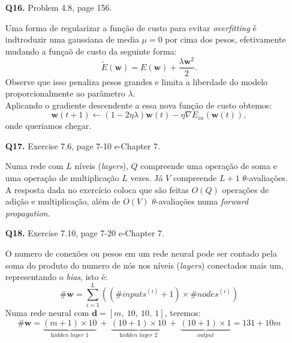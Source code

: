 \documentclass[12pt]{article}
\begin{document}
\begin{enumerate}
\begin{addmargin}[1em]{2em}
\begin{align*}
		\end{align*}
		\begin{itemize}
			\item[a)] Queremos $\nabla E_{in}(\mathbf{w}) = 0$, então, da expressão acima o valor de \textbf{w} que minimiza $E_{in}$ é $\mathbf{w_{lin}}$.
			\item[b)] O menor $E_{in}$ ocorre quando $\mathbf{w_{lin}} = (Z^TZ)^{-1}Z^Ty$.
		\end{itemize}
	\end{addmargin}
\item [\textbf{Q16.}] Problem 4.8, page 156.
	\begin{addmargin}[1em]{2em}
		Uma forma de regularizar a função de custo para evitar \textit{overfitting} é indtroduzir uma gaussiana de media $\mu = 0$ por cima dos pesos, efetivamente mudando a funçaõ de custo da seguinte forma: \[\tilde{E}(\mathbf{w}) = E(\mathbf{w}) + \frac{\lambda \mathbf{w}^2}{2}.\]
		Observe que isso penaliza pesos grandes e limita a liberdade do modelo proporcionalmente ao parâmetro $\lambda$.\\
		Aplicando o gradiente descendente a essa nova função de custo obtemos: \[\mathbf{w}(t+1) \leftarrow (1-2\eta \lambda)\mathbf{w}(t) - \eta \nabla E_{in}(\mathbf{w}(t)),\]
		onde queriamos chegar.
	\end{addmargin}
\item [\textbf{Q17.}] Exercise 7.6, page 7-10 e-Chapter 7.
	\begin{addmargin}[1em]{2em}
		Numa rede com $L$ níveis (\textit{layers}), $Q$ compreende uma operação de soma e uma operação de multiplicação $L$ vezes. Já $V$ compreende $L+1$ $\theta$-avaliações.\\
		A resposta dada no exercício coloca que são feitas $O(Q)$ operações de adição e multiplicação, além de $O(V)$ $\theta$-avaliações numa \textit{forward propagation}.
	\end{addmargin}
\item [\textbf{Q18.}] Exercise 7.10, page 7-20 e-Chapter 7.
	\begin{addmargin}[1em]{2em}
		O numero de conexões ou pesos em um rede neural pode ser contado pela soma do produto do numero de nós nos níveis (\textit{layers}) conectados mais um, representando o \textit{bias}, isto é: \[\#\mathbf{w}= \sum_{i=1}^{L} \left( (\#inputs^{(i)} + 1) \times \#nodes^{(i)} \right) \] 
		Numa rede neural com $\mathbf{d} = [m,\ 10,\ 10,\ 1]$, teremos: \[\#\mathbf{w} = \underbrace{(m + 1) \times 10}_\textit{hidden layer 1}\ +\ \underbrace{(10 + 1) \times 10}_\textit{hidden layer 2}\ +\ \underbrace{(10 + 1) \times 1}_\textit{output} = 131 + 10m\]
	\end{addmargin}	


\end{enumerate}
\end{document}

